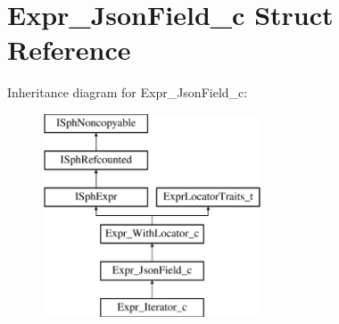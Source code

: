 \hypertarget{structExpr__JsonField__c}{\section{Expr\-\_\-\-Json\-Field\-\_\-c Struct Reference}
\label{structExpr__JsonField__c}
}
Inheritance diagram for Expr\-\_\-\-Json\-Field\-\_\-c\-:\begin{figure}[H]
\begin{center}
\leavevmode
\includegraphics[height=6.000000cm]{structExpr__JsonField__c}
\end{center}
\end{figure}
